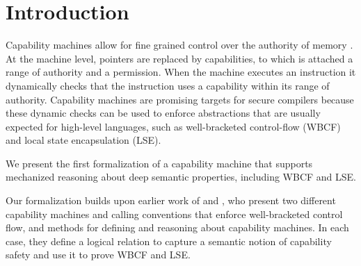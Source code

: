 \documentclass[sigplan,review]{acmart}\settopmatter{printfolios=true,printccs=false,printacmref=false}
\begin{document}




\maketitle


\section{Introduction}

Capability machines allow for fine grained control over the authority of memory \cite{levy_capability-based_1984,watson_cheri:_2015}.
At the machine level, pointers are replaced by capabilities, to which is attached a range of authority and a permission.
When the machine executes an instruction it dynamically checks that the instruction uses a capability within its range of authority.
Capability machines are promising targets for secure compilers because these dynamic checks can be used to enforce abstractions that are usually expected for high-level languages, such as well-bracketed
control-flow (WBCF) and local state encapsulation (LSE). 

We present the first formalization of a capability machine that supports mechanized reasoning about deep semantic properties, including WBCF and LSE.

Our formalization builds upon earlier work of \citeauthor{skorstengaardESOP18} \cite{skorstengaardESOP18} and \cite{SkorstengaardPOPL19}, who present two different capability machines and calling conventions that enforce well-bracketed control flow, and methods for defining and reasoning about capability machines.
In each case, they define a logical relation to capture a semantic
notion of capability safety and use it to prove WBCF and LSE.
\end{document}
